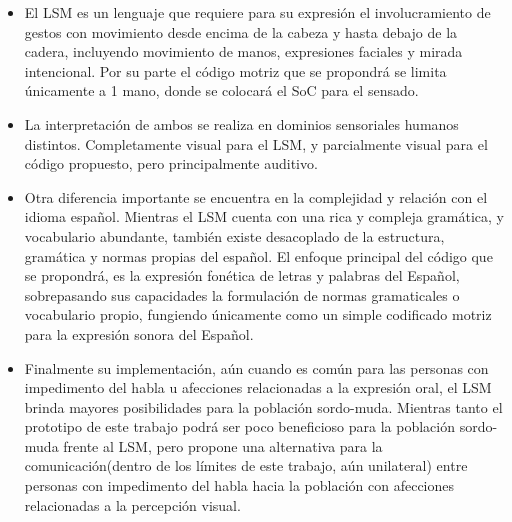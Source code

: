 \begin{itemize}
	\item El LSM es un lenguaje que requiere para su expresión el involucramiento de gestos con movimiento desde encima de la cabeza y hasta debajo de la cadera, incluyendo movimiento de manos, expresiones faciales y mirada intencional. Por su parte el código motriz que se propondrá se limita únicamente a 1 mano, donde se colocará el SoC para el sensado.
	
	\item La interpretación de ambos se realiza en dominios sensoriales humanos distintos. Completamente visual para el LSM, y parcialmente visual para el código propuesto, pero principalmente auditivo.
	
	\item Otra diferencia importante se encuentra en la complejidad y relación con el idioma español. Mientras el LSM cuenta con una rica y compleja gramática, y vocabulario abundante, también existe desacoplado de la estructura, gramática y normas propias del español. El enfoque principal del código que se propondrá, es la expresión fonética de letras y palabras del Español, sobrepasando sus capacidades la formulación de normas gramaticales o vocabulario propio, fungiendo únicamente como un simple codificado motriz para la expresión sonora del Español.
	
	\item Finalmente su implementación, aún cuando es común para las personas con impedimento del habla u afecciones relacionadas a la expresión oral, el LSM brinda mayores posibilidades para la población sordo-muda. Mientras tanto el prototipo de este trabajo podrá ser poco beneficioso para la población sordo-muda frente al LSM, pero propone una alternativa para la comunicación(dentro de los límites de este trabajo, aún unilateral) entre personas con impedimento del habla hacia la población con afecciones relacionadas a la percepción visual.
\end{itemize}






